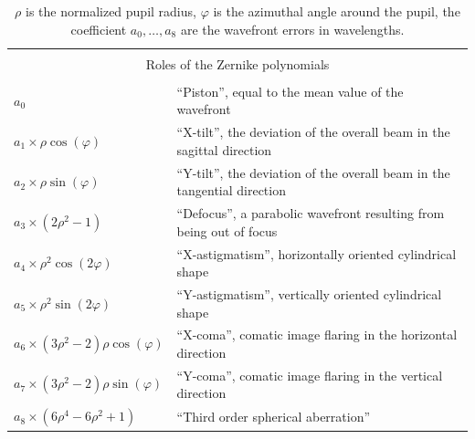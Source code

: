 \begin{table}
\begin{tabular}{ll}
\hline\hline
&  \\
\multicolumn{2}{c}{Roles of the Zernike polynomials} \\
&  \\
$a_0$ & ``Piston'', equal to the mean value of the wavefront \\
$a_1\times\rho\cos(\varphi)$ & ``X-tilt'', the deviation of the overall beam in the sagittal direction \\
$a_2\times\rho\sin(\varphi)$ & ``Y-tilt'', the deviation of the overall beam in the tangential direction \\
$a_3\times(2\rho^2-1)$ & ``Defocus'', a parabolic wavefront resulting from being out of focus \\
$a_4\times\rho^2\cos(2\varphi)$ & ``X-astigmatism'', horizontally oriented cylindrical shape \\
$a_5\times\rho^2\sin(2\varphi)$ & ``Y-astigmatism'', vertically oriented cylindrical shape \\
$a_6\times(3\rho^2-2)\rho\cos(\varphi)$ & ``X-coma'', comatic image flaring in the horizontal direction \\
$a_7\times(3\rho^2-2)\rho\sin(\varphi)$ & ``Y-coma'', comatic image flaring in the vertical direction \\
$a_8\times(6\rho^4-6\rho^2+1)$ & ``Third order spherical aberration'' \\
\hline
\end{tabular}
\caption
{$\rho$ is the normalized pupil radius, $\varphi$ is the azimuthal angle around the pupil,
the coefficient $a_0,\ldots,a_8$ are the wavefront errors in wavelengths.}
\label{tab:zernike-polynomials}
\end{table}

